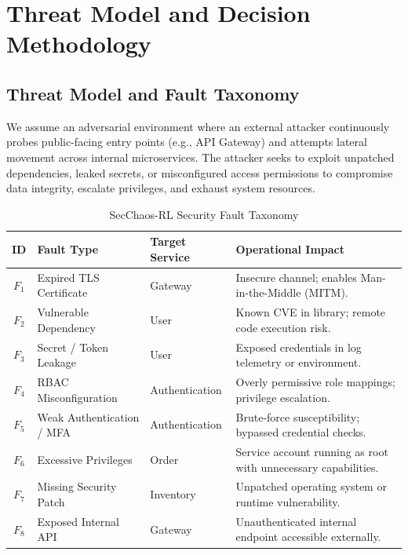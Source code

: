 \documentclass[ASNA,twocolumn]{USG}
\begin{document}
\section{Threat Model and Decision Methodology}
\label{sec:methodology}

\subsection{Threat Model and Fault Taxonomy}
We assume an adversarial environment where an external attacker continuously probes public-facing entry points (e.g., API Gateway) and attempts lateral movement across internal microservices. The attacker seeks to exploit unpatched dependencies, leaked secrets, or misconfigured access permissions to compromise data integrity, escalate privileges, and exhaust system resources.

\begin{table}[!t]
\centering
\small
\caption{SecChaos-RL Security Fault Taxonomy}
\label{tab:fault_categories}
\begin{tabular*}{\textwidth}{@{\extracolsep{\fill}}cllp{8.5cm}@{\extracolsep{\fill}}}
\toprule
\textbf{ID} & \textbf{Fault Type} & \textbf{Target Service} & \textbf{Operational Impact} \\
\midrule
$F_1$ & Expired TLS Certificate & Gateway & Insecure channel; enables Man-in-the-Middle (MITM). \\
$F_2$ & Vulnerable Dependency & User & Known CVE in library; remote code execution risk. \\
$F_3$ & Secret / Token Leakage & User & Exposed credentials in log telemetry or environment. \\
$F_4$ & RBAC Misconfiguration & Authentication & Overly permissive role mappings; privilege escalation. \\
$F_5$ & Weak Authentication / MFA & Authentication & Brute-force susceptibility; bypassed credential checks. \\
$F_6$ & Excessive Privileges & Order & Service account running as root with unnecessary capabilities. \\
$F_7$ & Missing Security Patch & Inventory & Unpatched operating system or runtime vulnerability. \\
$F_8$ & Exposed Internal API & Gateway & Unauthenticated internal endpoint accessible externally. \\
\bottomrule
\end{tabular*}
\end{table}
\end{document}
